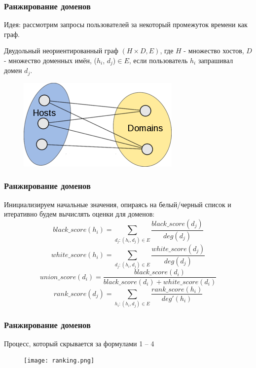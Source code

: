 \documentclass[12pt,pdf,hyperref={unicode}]{beamer}
\begin{document}
\begin{frame}
\frametitle{Ранжирование доменов}
Идея: рассмотрим запросы пользователей за некоторый промежуток времени как граф.
\newline
\begin{definition}Двудольный неориентированный граф $(H\times D,  E)$, 
где $H$ - множество хостов, $D$ - множество доменных имён, ($h_i$, $d_j$)$\in$$E$, если пользователь $h_i$ запрашивал домен $d_j$. 
\end{definition}

\begin{figure}[H]
	\centering
	\includegraphics[scale=2.]{b_graph.png}
\end{figure}
\end{frame}


\begin{frame}
\frametitle{Ранжирование доменов}
Инициализируем начальные значения, опираясь на белый/черный список и итеративно будем вычислять оценки для доменов:
\begin{equation}
	\label{eq:dr1-black}
	black\_score(h_i) = \sum_{d_j: (h_i, d_j)\in E} \frac{black\_score(d_j)}{deg(d_j)}
\end{equation}
\begin{equation}
	\label{eq:dr1-white}
	white\_score(h_i) = \sum_{d_j: (h_i, d_j)\in E} \frac{white\_score(d_j)}{deg(d_j)}
\end{equation}
\begin{equation}
	\label{eq:dr1-union}
	union\_score(d_i) = \frac{black\_score(d_i)}{black\_score(d_i) + white\_score(d_i)}
\end{equation}
\begin{equation}
	\label{eq:dr2-rank}
	rank\_score(d_j) = \sum_{h_i: (h_i, d_j)\in E} \frac{rank\_score(h_i)}{deg'(h_i)}
\end{equation}
\end{frame}


\begin{frame}
\frametitle{Ранжирование доменов}
Процесс, который скрывается за формулами 1 -- 4
\begin{figure}[H]
	\centering
	\texttt{[image: ranking.png]}
\end{figure}
\end{frame}
\end{document}
